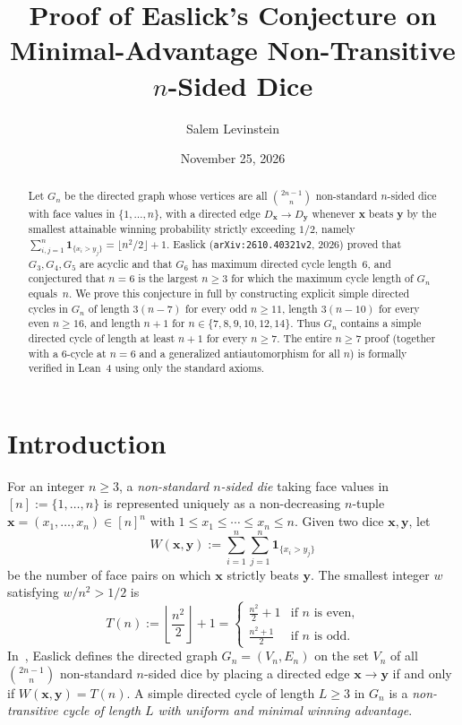 \documentclass[11pt]{article}
\title{Proof of Easlick's Conjecture on Minimal-Advantage Non-Transitive $n$-Sided Dice}
\author{Salem Levinstein}
\date{November 25, 2026}
\begin{document}
\maketitle

\begin{abstract}
Let $G_n$ be the directed graph whose vertices are all $\binom{2n-1}{n}$ non-standard $n$-sided dice with face values in $\{1,\dots,n\}$, with a directed edge $D_{\mathbf{x}} \to D_{\mathbf{y}}$ whenever $\mathbf{x}$ beats $\mathbf{y}$ by the smallest attainable winning probability strictly exceeding $1/2$, namely $\sum_{i,j=1}^n \mathbf{1}_{\{x_i > y_j\}} = \lfloor n^2/2 \rfloor + 1$. Easlick (\texttt{arXiv:2610.40321v2}, 2026) proved that $G_3,G_4,G_5$ are acyclic and that $G_6$ has maximum directed cycle length~$6$, and conjectured that $n=6$ is the largest $n \ge 3$ for which the maximum cycle length of $G_n$ equals~$n$. We prove this conjecture in full by constructing explicit simple directed cycles in $G_n$ of length $3(n-7)$ for every odd $n \ge 11$, length $3(n-10)$ for every even $n \ge 16$, and length $n+1$ for $n \in \{7,8,9,10,12,14\}$. Thus $G_n$ contains a simple directed cycle of length at least $n+1$ for every $n \ge 7$. The entire $n \ge 7$ proof (together with a $6$-cycle at $n=6$ and a generalized antiautomorphism for all $n$) is formally verified in Lean~4 using only the standard axioms.
\end{abstract}

\section{Introduction}

For an integer $n \ge 3$, a \emph{non-standard $n$-sided die} taking face values in $[n] := \{1,\dots,n\}$ is represented uniquely as a non-decreasing $n$-tuple $\mathbf{x} = (x_1,\dots,x_n) \in [n]^n$ with $1 \le x_1 \le \cdots \le x_n \le n$. Given two dice $\mathbf{x},\mathbf{y}$, let
\[
  W(\mathbf{x},\mathbf{y}) := \sum_{i=1}^n \sum_{j=1}^n \mathbf{1}_{\{x_i > y_j\}}
\]
be the number of face pairs on which $\mathbf{x}$ strictly beats $\mathbf{y}$. The smallest integer $w$ satisfying $w/n^2 > 1/2$ is
\[
  T(n) := \left\lfloor \frac{n^2}{2} \right\rfloor + 1 =
  \begin{cases}
    \frac{n^2}{2} + 1 & \text{if } n \text{ is even,} \\[3pt]
    \frac{n^2 + 1}{2} & \text{if } n \text{ is odd.}
  \end{cases}
\]
In~\cite{easlick2026}, Easlick defines the directed graph $G_n = (V_n, E_n)$ on the set $V_n$ of all $\binom{2n-1}{n}$ non-standard $n$-sided dice by placing a directed edge $\mathbf{x} \to \mathbf{y}$ if and only if $W(\mathbf{x},\mathbf{y}) = T(n)$. A simple directed cycle of length $L \ge 3$ in $G_n$ is a \emph{non-transitive cycle of length $L$ with uniform and minimal winning advantage}.
\end{document}
